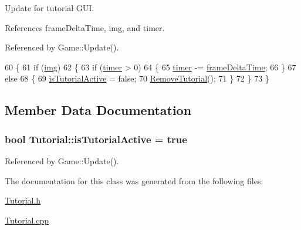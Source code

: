 Update for tutorial G\-U\-I. 



 

 

References frame\-Delta\-Time, img, and timer.



Referenced by Game\-::\-Update().


\begin{DoxyCode}
60 \{
61     \textcolor{keywordflow}{if} (\hyperlink{_tutorial_8cpp_ab78bbad0d868386965dd51927f9a6a34}{img})
62     \{
63         \textcolor{keywordflow}{if} (\hyperlink{_tutorial_8cpp_ae2c6087027bfdf561a2b766975b47ee8}{timer} > 0)
64         \{
65             \hyperlink{_tutorial_8cpp_ae2c6087027bfdf561a2b766975b47ee8}{timer} -= \hyperlink{_player_8cpp_adc988571147642cda93afbf89783f9c9}{frameDeltaTime};
66         \}
67         \textcolor{keywordflow}{else}
68         \{
69             \hyperlink{class_tutorial_a050c9844b3a52de799105883893ca073}{isTutorialActive} = \textcolor{keyword}{false};
70             \hyperlink{class_tutorial_a0bef62d9bb8e461bfa119e80bacc1ca5}{RemoveTutorial}();
71         \}
72     \}
73 \}
\end{DoxyCode}


\subsection{Member Data Documentation}
\hypertarget{class_tutorial_a050c9844b3a52de799105883893ca073}{
\subsubsection[{is\-Tutorial\-Active}]{\setlength{\rightskip}{0pt plus 5cm}bool Tutorial\-::is\-Tutorial\-Active = true}}\label{class_tutorial_a050c9844b3a52de799105883893ca073}


Referenced by Game\-::\-Update().



The documentation for this class was generated from the following files\-:\begin{DoxyCompactItemize}
\item 
\hyperlink{_tutorial_8h}{Tutorial.\-h}\item 
\hyperlink{_tutorial_8cpp}{Tutorial.\-cpp}\end{DoxyCompactItemize}

